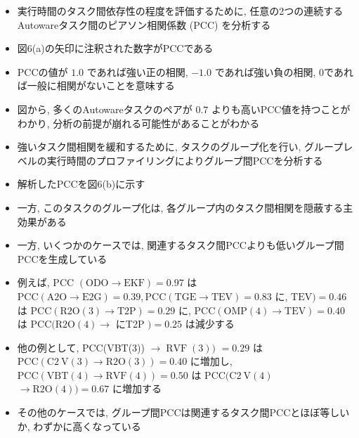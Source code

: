 \begin{frame}{}
    \begin{itemize}
        \item 実行時間のタスク間依存性の程度を評価するために, 任意の2つの連続するAutowareタスク間のピアソン相関係数 (PCC) を分析する
\item 図6(a)の矢印に注釈された数字がPCCである
\item PCCの値が $1.0$ であれば強い正の相関, $-1.0$ であれば強い負の相関, 0であれば一般に相関がないことを意味する
\item 図から, 多くのAutowareタスクのペアが $0.7$ よりも高いPCC値を持つことがわかり, 分析の前提が崩れる可能性があることがわかる
\item 強いタスク間相関を緩和するために, タスクのグループ化を行い, グループレベルの実行時間のプロファイリングによりグループ間PCCを分析する
\item 解析したPCCを図6(b)に示す
\item 一方, このタスクのグループ化は, 各グループ内のタスク間相関を隠蔽する主効果がある
    \end{itemize}
\end{frame}

\begin{frame}{}
    \begin{itemize}
        \item 一方, いくつかのケースでは, 関連するタスク間PCCよりも低いグループ間PCCを生成している
\item 例えば, PCC $(\mathrm{ODO} \rightarrow \mathrm{EKF})=0.97$ は $\mathrm{PCC}(\mathrm{A} 2 \mathrm{O} \rightarrow \mathrm{E} 2 \mathrm{G})=0.39, \mathrm{PCC}(\mathrm{TGE} \rightarrow \mathrm{TEV})=0.83$ に, $\mathrm{TEV})=0.46$ は $\mathrm{PCC}(\mathrm{R} 2 \mathrm{O}(3) \rightarrow \mathrm{T} 2 \mathrm{P})=0.29$ に, $\mathrm{PCC}(\mathrm{OMP}(4) \rightarrow \mathrm{TEV})=0.40$ は $\mathrm{PCC}(\mathrm{R} 2 \mathrm{O}(4) \rightarrow$ にT2P $)=0.25$ は減少する
\item 他の例として, PCC(VBT(3)) $\rightarrow \operatorname{RVF}(3))$  $=0.29$ は $\mathrm{PCC}(\mathrm{C} 2 \mathrm{~V}(3) \rightarrow \mathrm{R} 2 \mathrm{O}(3))=0.40$ に増加し, $\mathrm{PCC}(\mathrm{VBT}(4) \rightarrow \mathrm{RVF}(4))=0.50$ は $\mathrm{PCC}(\mathrm{C} 2 \mathrm{~V}(4)$  $\rightarrow \mathrm{R} 2 \mathrm{O}(4))=0.67$ に増加する
\item その他のケースでは, グループ間PCCは関連するタスク間PCCとほぼ等しいか, わずかに高くなっている
    \end{itemize}
\end{frame}
